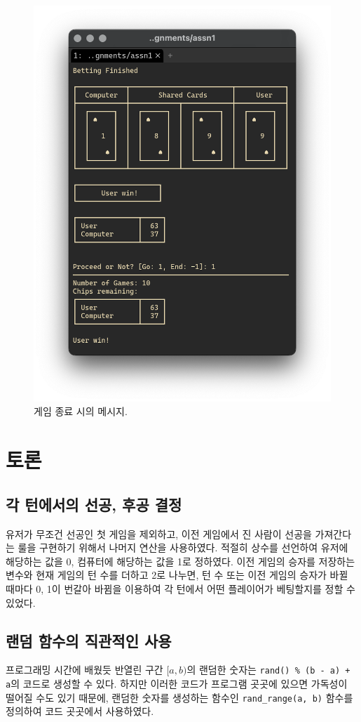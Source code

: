 \documentclass[titlepage]{article}
\begin{document}
\begin{figure}[H]
  \centering
  \includegraphics[width=0.6\linewidth]{gameover.png}
  \caption{게임 종료 시의 메시지.}
\end{figure}

\section{토론}

\subsection{각 턴에서의 선공, 후공 결정}

유저가 무조건 선공인 첫 게임을 제외하고, 이전 게임에서 진 사람이 선공을 가져간다는 룰을 구현하기 위해서 나머지 연산을 사용하였다. 적절히 상수를 선언하여 유저에 해당하는 값을 0, 컴퓨터에 해당하는 값을 1로 정하였다. 이전 게임의 승자를 저장하는 변수와 현재 게임의 턴 수를 더하고 2로 나누면, 턴 수 또는 이전 게임의 승자가 바뀔 때마다 0, 1이 번갈아 바뀜을 이용하여 각 턴에서 어떤 플레이어가 베팅할지를 정할 수 있었다.

\subsection{랜덤 함수의 직관적인 사용}

프로그래밍 시간에 배웠듯 반열린 구간 \([a, b)\)의 랜덤한 숫자는 \texttt{rand() \% (b - a) + a}의 코드로 생성할 수 있다. 하지만 이러한 코드가 프로그램 곳곳에 있으면 가독성이 떨어질 수도 있기 때문에, 랜덤한 숫자를 생성하는 함수인 \texttt{rand\_range(a, b)} 함수를 정의하여 코드 곳곳에서 사용하였다.
\end{document}
